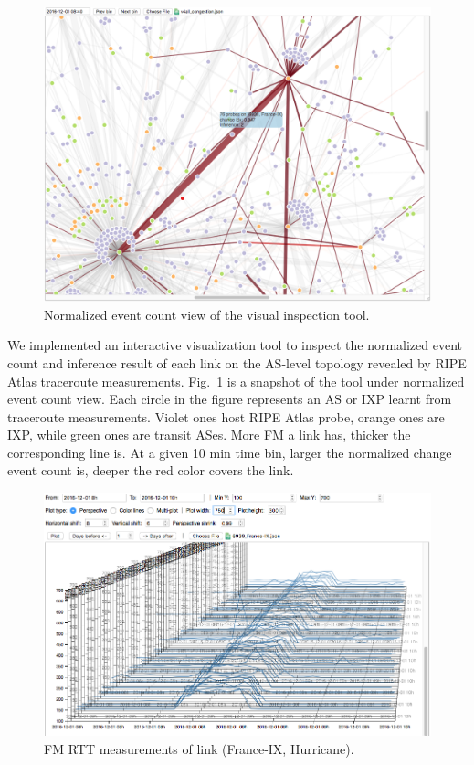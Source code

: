 \begin{figure}[!htb]
\centering
\includegraphics[width=1\textwidth]{gfx/chap5/case_event_count.png}
\caption{Normalized event count view of the visual inspection tool.}
\label{fig:case_event_count}
\end{figure}

We implemented an interactive visualization tool to inspect the normalized event count and inference result of each link on the AS-level topology revealed by RIPE Atlas traceroute measurements.
Fig.~\ref{fig:case_event_count} is a snapshot of the tool under normalized event count view.
Each circle in the figure represents an AS or IXP learnt from traceroute measurements. Violet ones host RIPE Atlas probe, orange ones are IXP, while green ones are transit ASes. More \ac{FM} a link has, thicker the corresponding line is. At a given 10 min time bin, larger the normalized change event count is, deeper the red color covers the link.

\begin{figure}[!htb]
\centering
\includegraphics[width=1\textwidth]{gfx/chap5/case_multi_rtt.png}
\caption{\ac{FM} RTT measurements of link (France-IX, Hurricane).}
\label{fig:case_multi_rtt}
\end{figure}

